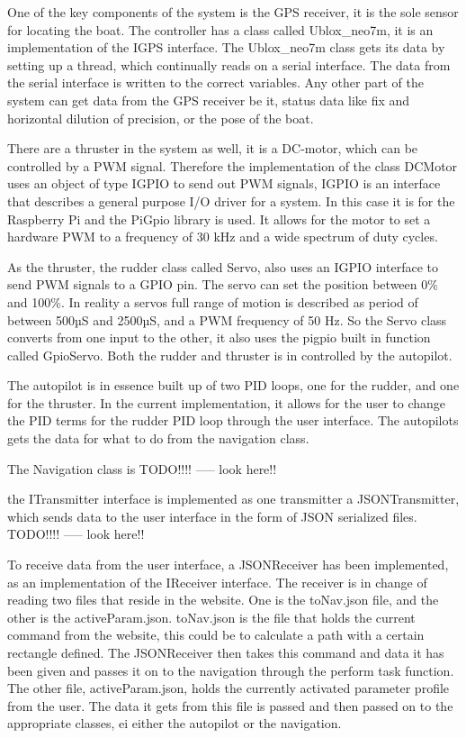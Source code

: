 One of the key components of the system is the GPS receiver, it is the sole sensor for locating the boat. The controller has a class called Ublox\_neo7m, it is an implementation of the IGPS interface. The Ublox\_neo7m class gets its data by setting up a thread, which continually reads on a serial interface. The data from the serial interface is written to the correct variables. Any other part of the system can get data from the GPS receiver be it, status data like fix and horizontal dilution of precision, or the pose of the boat. 

There are a thruster in the system as well, it is a DC-motor, which can be controlled by a PWM signal. Therefore the implementation of the class DCMotor uses an object of type IGPIO to send out PWM signals, IGPIO is an interface that describes a general purpose I/O driver for a system. In this case it is for the Raspberry Pi and the PiGpio library is used\cite{pigpio}. It allows for the motor to set a hardware PWM to a frequency of 30 kHz and a wide spectrum of duty cycles.

As the thruster, the rudder class called Servo, also uses an IGPIO interface to send PWM signals to a GPIO pin. The servo can set the position between 0\% and 100\%. In reality a servos full range of motion is described as period of between 500µS and 2500µS, and a PWM frequency of 50 Hz. So the Servo class converts from one input to the other, it also uses the pigpio built in function called GpioServo. Both the rudder and thruster is in controlled by the autopilot.

The autopilot is in essence built up of two PID loops, one for the rudder, and one for the thruster. In the current implementation, it allows for the user to change the PID terms for the rudder PID loop through the user interface. The autopilots gets the data for what to do from the navigation class.

The Navigation class is TODO!!!! ----- look here!!

the ITransmitter interface is implemented as one transmitter a JSONTransmitter, which sends data to the user interface in the form of JSON serialized files. TODO!!!! ----- look here!!

To receive data from the user interface, a JSONReceiver has been implemented, as an implementation of the IReceiver interface. The receiver is in change of reading two files that reside in the website. One is the toNav.json file, and the other is the activeParam.json. toNav.json is the file that holds the current command from the website, this could be to calculate a path with a certain rectangle defined. The JSONReceiver then takes this command and data it has been given and passes it on to the navigation through the perform task function. The other file, activeParam.json, holds the currently activated parameter profile from the user. The data it gets from this file is passed and then passed on to the appropriate classes, ei either the autopilot or the navigation.

